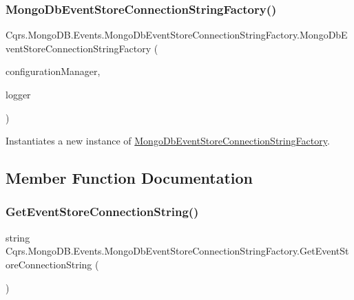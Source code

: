 \subsubsection{\texorpdfstring{Mongo\+Db\+Event\+Store\+Connection\+String\+Factory()}{MongoDbEventStoreConnectionStringFactory()}}
{\footnotesize\ttfamily Cqrs.\+Mongo\+D\+B.\+Events.\+Mongo\+Db\+Event\+Store\+Connection\+String\+Factory.\+Mongo\+Db\+Event\+Store\+Connection\+String\+Factory (\begin{DoxyParamCaption}\item[{\hyperlink{interfaceCqrs_1_1Configuration_1_1IConfigurationManager}{I\+Configuration\+Manager}}]{configuration\+Manager,  }\item[{I\+Logger}]{logger }\end{DoxyParamCaption})}



Instantiates a new instance of \hyperlink{classCqrs_1_1MongoDB_1_1Events_1_1MongoDbEventStoreConnectionStringFactory}{Mongo\+Db\+Event\+Store\+Connection\+String\+Factory}. 



\subsection{Member Function Documentation}
\mbox{\label{classCqrs_1_1MongoDB_1_1Events_1_1MongoDbEventStoreConnectionStringFactory_af78f60c035678185ecd266019f42838b_af78f60c035678185ecd266019f42838b}} 
\subsubsection{\texorpdfstring{Get\+Event\+Store\+Connection\+String()}{GetEventStoreConnectionString()}}
{\footnotesize\ttfamily string Cqrs.\+Mongo\+D\+B.\+Events.\+Mongo\+Db\+Event\+Store\+Connection\+String\+Factory.\+Get\+Event\+Store\+Connection\+String (\begin{DoxyParamCaption}{ }\end{DoxyParamCaption})}



